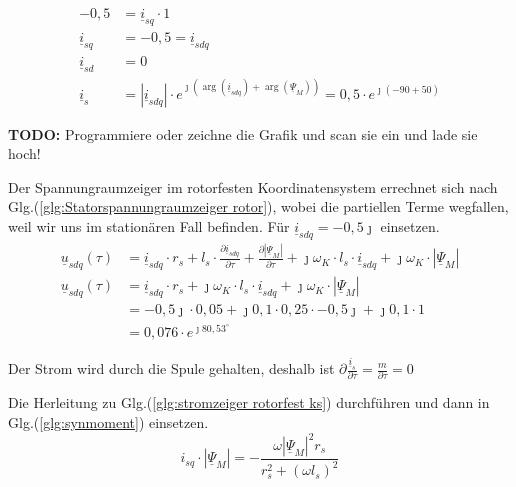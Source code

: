\begin{solution}
\begin{compactenum}
\begin{align}
-0,5 &= \underline{i}_{sq} \cdot 1\\
\underline{i}_{sq} &= -0,5 = \underline{i}_{sdq} \\
\underline{i}_{sd} &= 0\\
\underline{i}_{s} &= |\underline{i}_{sdq}| \cdot e^{\jmath (\arg(\underline{i}_{sdq}) + \arg(\underline{\Psi}_{M}))}= 0,5 \cdot e^{\jmath ( -90 + 50)}
\end{align}
\item \textbf{TODO:} Programmiere oder zeichne die Grafik und scan sie ein und lade sie hoch!
\item Der Spannungraumzeiger im rotorfesten Koordinatensystem errechnet sich nach Glg.(\ref{glg:Statorspannungraumzeiger rotor}), wobei die partiellen Terme wegfallen, weil wir uns im stationären Fall befinden. Für $\underline{i}_{sdq}= -0,5 \jmath$ einsetzen.
\begin{align}
\underline{u}_{sdq}(\tau) &= \underline{i}_{sdq} \cdot r_s + l_s \cdot \frac{\partial \underline{i}_{sdq}}{\partial \tau} + \frac{\partial |\underline{\Psi}_M|}{\partial \tau} + \jmath \omega_K \cdot l_s \cdot \underline{i}_{sdq} + \jmath \omega_K \cdot |\underline{\Psi}_M|\\
\underline{u}_{sdq}(\tau) &= \underline{i}_{sdq} \cdot r_s + \jmath \omega_K \cdot l_s \cdot \underline{i}_{sdq} + \jmath \omega_K \cdot |\underline{\Psi}_M|\\
&= -0,5 \jmath \cdot 0,05 + \jmath 0,1 \cdot 0,25 \cdot -0,5 \jmath+\jmath 0,1 \cdot 1\\
&=0,076 \cdot e^{\jmath 80,53^\circ}
\end{align}
\item Der Strom wird durch die Spule gehalten, deshalb ist $\partial \frac{\underline{i}_s}{\partial \tau} = \frac{m}{\partial \tau} = 0$
\item Die Herleitung zu Glg.(\ref{glg:stromzeiger rotorfest ks}) durchführen und dann in Glg.(\ref{glg:synmoment}) einsetzen.
\begin{equation}
i_{sq} \cdot | \underline{\Psi}_M| = -\frac{\omega |\underline{\Psi}_M|^2 r_s}{r_s^2 + (\omega l_s)^2}
\end{equation}
\end{compactenum}
\end{solution}